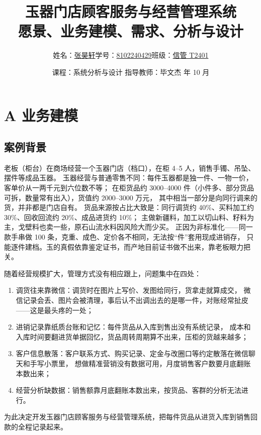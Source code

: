 \documentclass[12pt, a4paper]{ctexart}
\title{玉器门店顾客服务与经营管理系统\\[6pt] \large 愿景、业务建模、需求、分析与设计}
\author{姓名：\underline{张昊轩}\quad 学号：\underline{8102240429}\quad 班级：\underline{信管 T2401}}
\date{课程：系统分析与设计 \quad 指导教师：毕文杰 \quad 2026 年 10 月}
\begin{document}
\maketitle

\tableofcontents

\newpage

\section{A 业务建模}

\subsection{案例背景}

老板（柜台）在商场经营一个玉器门店（档口），在柜 4–5 人，销售手镯、吊坠、摆件等成品玉器。
玉器经营与普通零售不同：每件玉器都是独一件、一物一价，客单价从一两千元到六位数不等；
在柜货品约 3000–4000 件（小件多、部分货品可拆，数量常有出入），货值约 2000–3000 万元，
其中相当一部分是向同行调来的货，并非都是门店自有。
货品来源按占比大致是：同行调货约 40\%、买料加工约 30\%、回收回流约 20\%、成品进货约 10\%；
主做新疆料，加工以切山料、籽料为主，戈壁料也卖一些，原石山流水料因风险大而少买。
正因为非标准化——同一款手串做 100 条，克重、成色、定价各不相同，无法按“件”套用现成进销存，
只能逐件建档。玉的真假依靠鉴定证书，而产地目前证书做不出来，靠老板眼力把关。

随着经营规模扩大，管理方式没有相应跟上，问题集中在四处：

\begin{enumerate}[leftmargin=1.6em, itemsep=2pt]
  \item 调货往来靠微信：调货时在图片上写价、发图给同行，货拿走就算成交，
        微信记录会丢、图片会被清理，事后认不出调出去的是哪一件，对账经常扯皮——这是最头疼的一处；
  \item 进销记录靠纸质台账和记忆：每件货品从入库到售出没有系统记录，
        成本和入库时间要翻进货单据回忆，货品周转周期算不出来，压柜的货越来越多；
  \item 客户信息散落：客户联系方式、购买记录、定金与改圈口等约定散落在微信聊天和手写小票里，
        想做精准营销没有数据可用，月度销售客户数要月底翻账本数出来；
  \item 经营分析缺数据：销售额靠月底翻账本数出来，按货品、客群的分析无法进行。
\end{enumerate}

为此决定开发玉器门店顾客服务与经营管理系统，把每件货品从进货入库到销售回款的全程记录起来。
\end{document}

